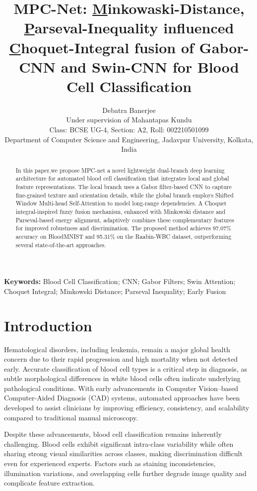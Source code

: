 \documentclass[12pt]{article}
\title{\large MPC-Net: \underline{M}inkowaski-Distance, \underline{P}arseval-Inequality influenced \underline{C}hoquet-Integral fusion of Gabor-CNN and Swin-CNN for Blood Cell Classification}
\author{%
Debatra Banerjee\\[0.5em]
\normalsize Under supervision of Mahantapas Kundu\\[0.25em]
\normalsize Class: BCSE UG-4, Section: A2, Roll: 002210501099\\[0.25em]
\normalsize Department of Computer Science and Engineering, Jadavpur University, Kolkata, India\\[0.25em]
}
\date{}
\begin{document}
\maketitle


\begin{abstract}
In this paper,we propose MPC-net a novel lightweight dual-branch deep learning architecture for automated blood cell classification that integrates local and global feature representations. The local branch uses a Gabor filter-based CNN to capture fine-grained texture and orientation details, while the global branch employs Shifted Window Multi-head Self-Attention to model long-range dependencies. A Choquet integral-inspired fuzzy fusion mechanism, enhanced with Minkowski distance and Parseval-based energy alignment, adaptively combines these complementary features for improved robustness and discrimination. The proposed method achieves 97.07\% accuracy on BloodMNIST and 95.31\% on the Raabin-WBC dataset, outperforming several state-of-the-art approaches.%
\end{abstract}

\noindent\textbf{Keywords:} Blood Cell Classification; CNN; Gabor Filters; Swin Attention; Choquet Integral; Minkowski Distance; Parseval Inequality; Early Fusion

\section{Introduction}

Hematological disorders, including leukemia, remain a major global health concern due to their rapid progression and high mortality when not detected early. Accurate classification of blood cell types is a critical step in diagnosis, as subtle morphological differences in white blood cells often indicate underlying pathological conditions. With early advancements in Computer Vision–based Computer-Aided Diagnosis (CAD) systems, automated approaches have been developed to assist clinicians by improving efficiency, consistency, and scalability compared to traditional manual microscopy.

Despite these advancements, blood cell classification remains inherently challenging. Blood cells exhibit significant intra-class variability while often sharing strong visual similarities across classes, making discrimination difficult even for experienced experts. Factors such as staining inconsistencies, illumination variations, and overlapping cells further degrade image quality and complicate feature extraction.
\end{document}
